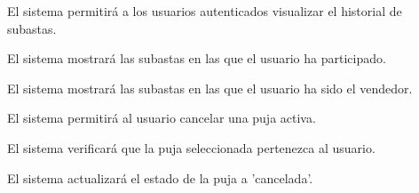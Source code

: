 \begin{RFSubastas}
\begin{RFSubastas}
	\end{RFSubastas}
	\item El sistema permitirá a los usuarios autenticados visualizar el historial de subastas.
	\begin{RFSubastas}
		\item El sistema mostrará las subastas en las que el usuario ha participado.
		\item El sistema mostrará las subastas en las que el usuario ha sido el vendedor.
	\end{RFSubastas}
	\item El sistema permitirá al usuario cancelar una puja activa.
	\begin{RFSubastas}
		\item El sistema verificará que la puja seleccionada pertenezca al usuario.
		\item El sistema actualizará el estado de la puja a 'cancelada'.
	\end{RFSubastas}
	
\end{RFSubastas}